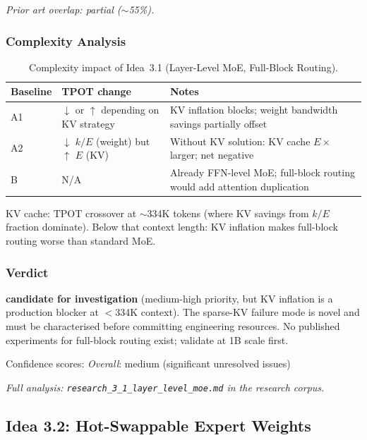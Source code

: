 \documentclass[11pt]{article}
\begin{document}
\noindent
\emph{Prior art overlap: partial ($\sim$55\%).}

\subsubsection*{Complexity Analysis}

\begin{table}[h]
\centering
\caption{Complexity impact of Idea~3.1 (Layer-Level MoE, Full-Block Routing).}
\label{tab:complexity-3-1}
\begin{tabular}{llp{7cm}}
\toprule
\textbf{Baseline} & \textbf{TPOT change} & \textbf{Notes} \\
\midrule
A1 & $\downarrow$ or $\uparrow$ depending on KV strategy & KV inflation blocks; weight bandwidth savings partially offset \\
A2 & $\downarrow$ $k/E$ (weight) but $\uparrow$ $E$ (KV) & Without KV solution: KV cache $E\times$ larger; net negative \\
B  & N/A & Already FFN-level MoE; full-block routing would add attention duplication \\
\bottomrule
\end{tabular}
\end{table}

\noindent
KV cache: TPOT crossover at $\sim$334K tokens (where KV savings from $k/E$ fraction dominate).
Below that context length: KV inflation makes full-block routing worse than standard MoE.

\subsubsection*{Verdict}
\textbf{candidate for investigation} (medium-high priority, but KV inflation is a production blocker at $<$334K context).
The sparse-KV failure mode is novel and must be characterised before committing engineering resources.
No published experiments for full-block routing exist; validate at 1B scale first.

\noindent
Confidence scores:
\emph{Overall}: medium (significant unresolved issues)

\par\noindent\textit{Full analysis: \texttt{research\_3\_1\_layer\_level\_moe.md} in the research corpus.}

\subsection{Idea 3.2: Hot-Swappable Expert Weights}
\label{subsec:idea-3-2}
\end{document}
